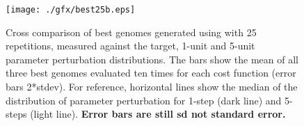 





\begin{figure}[tb!]
  \centering
  \texttt{[image: ./gfx/best25b.eps]}
  \caption{Cross comparison of best genomes generated using {\GA} with 25
    repetitions, measured against the target, 1-unit and 5-unit parameter
    perturbation distributions.  The bars show the mean of all three best
    genomes evaluated ten times for each cost function (error bars 2*stdev). For
    reference, horizontal lines show the median of the distribution of
    parameter perturbation for 1-step (dark line) and 5-steps (light
    line). {\textbf{Error bars are still sd not standard error.}}}\label{fig:R2}
\end{figure}


\newpage




